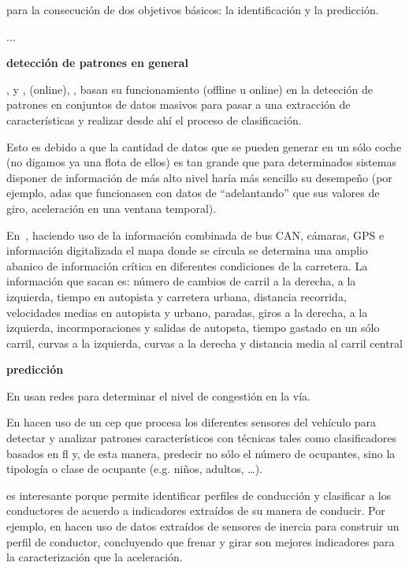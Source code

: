  para la consecución de dos objetivos básicos: la identificación y la predicción.

...

\textbf{detección de patrones en general}

\cite{sekizawa2007modeling}, \cite{terada2010multi} y \cite{bando2013unsupervised}, \cite{maye2011bayesian} (online), \cite{johnson2011driving}, \cite{van2013driver} \cite{bender2015unsupervised} basan su funcionamiento (offline u online) en la detección de patrones en conjuntos de datos masivos para pasar a una extracción de características y realizar desde ahí el proceso de clasificación.

Esto es debido a que la cantidad de datos que se pueden generar en un sólo coche (no digamos ya una flota de ellos) es tan grande que para determinados sistemas disponer de información de más alto nivel haría más sencillo su desempeño (por ejemplo, \gls{adas} que funcionasen con datos de \enquote{adelantando} que sus valores de giro, aceleración en una ventana temporal).

En~\cite{satzoda2013towards}, haciendo uso de la información combinada de bus CAN, cámaras, GPS e información digitalizada el mapa donde se circula se determina una amplio abanico de información crítica en diferentes condiciones de la carretera. La información que sacan es: número de cambios de carril a la derecha, a la izquierda, tiempo en autopista y carretera urbana, distancia recorrida, velocidades medias en autopista y urbano, paradas, giros a la derecha, a la izquierda, incormporaciones y salidas de autopsta, tiempo gastado en un sólo carril, curvas a la izquierda, curvas a la derecha y distancia media al carril central

\textbf{predicción}

En \cite{Dougherty1993} usan redes para determinar el nivel de congestión en la vía.

En \cite{terroso2015complex} hacen uso de un \gls{cep} que procesa los diferentes sensores del vehículo para detectar y analizar patrones característicos con técnicas tales como clasificadores basados en \gls{fl} y, de esta manera, predecir no sólo el número de ocupantes, sino la tipología o clase de ocupante (e.g. niños, adultos, \ldots).

 es interesante porque permite identificar perfiles de conducción y clasificar a los conductores de acuerdo a indicadores extraídos de su manera de conducir. Por ejemplo, en \cite{van2013driver} hacen uso de datos extraídos de sensores de inercia para construir un perfil de conductor, concluyendo que frenar y girar son mejores indicadores para la caracterización que la aceleración.

